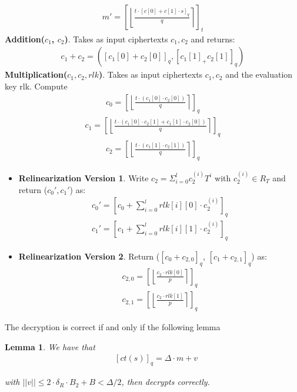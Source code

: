 \documentclass[A4paper,12pt]{article}
\newtheorem{lemma}[theorem]{Lemma}
\begin{document}
	\begin{align*}
		m' = \left[ \left \lfloor \frac{t \cdot [c[0] + c[1] \cdot s]_q}{q} \right \rceil \right]_t
	\end{align*}
\textbf{Addition($c_1$, $c_2$)}. Takes as input ciphertexts $c_1, c_2$ and returns:
	\begin{align*}
		c_1 + c_2 = ([c_1[0] + c_2[0]]_q, [c_1[1] _+ c_2[1]]_q)
	\end{align*}
\textbf{Multiplication($c_1, c_2, rlk$)}. Takes as input ciphertexts $c_1, c_2$ and the evaluation key rlk. Compute
	\begin{align*}
		c_0 = \left [ \left \lfloor \frac{t \cdot (c_1[0] \cdot c_2[0])}{q} \right \rceil \right]_q    	
	\end{align*}
	\begin{align*}
		c_1 = \left [ \left \lfloor \frac{t \cdot (c_1[0] \cdot c_2[1] + c_1[1] \cdot c_2[0])}{q} \right \rceil \right]_q
	\end{align*}
	\begin{align*}
		c_2 = \left [ \left \lfloor \frac{t \cdot (c_1[1] \cdot c_2[1])}{q} \right \rceil \right]_q    	
	\end{align*}
	
	\begin{itemize}
		\item \textbf{Relinearization Version 1}. Write $c_2 = \Sigma_{i=0}^l c_2^{(i)}T^i$ with $c_2^{(i)} \in R_T$ and return ($c_0', c_1'$) as:
		\begin{align*}
			c_0' = \left [c_0 + \sum_{i=0}^{l}rlk[i][0] \cdot c_2^{(i)} \right]_q
		\end{align*} 
		\begin{align*}
			c_1' = \left [c_1 + \sum_{i=0}^{l}rlk[i][1] \cdot c_2^{(i)} \right]_q
		\end{align*}
		\item \textbf{Relinearization Version 2}. Return ($[c_0 + c_{2,0}]_q$, $[c_1 + c_{2,1}]_q$) as:
		\begin{align*}
		c_{2,0} = \left [ \left \lfloor \frac{c_2 \cdot rlk[0]}{p} \right \rceil \right]_q
		\end{align*} 
		\begin{align*}
		c_{2,1} = \left [ \left \lfloor \frac{c_2 \cdot rlk[1]}{p} \right \rceil \right]_q
		\end{align*}
	\end{itemize}

The decryption is correct if and only if the following lemma
\begin{lemma}
	We have that 
	\begin{equation}
		\begin{aligned}
		&[ct(s)]_q = \Delta \cdot m + v
		\end{aligned}
	\end{equation}
	 
	with $||v|| \leq 2 \cdot \delta_R \cdot B_2 + B < \Delta / 2$, then decrypts correctly. \cite{SHE}
\end{lemma}
\end{document}
